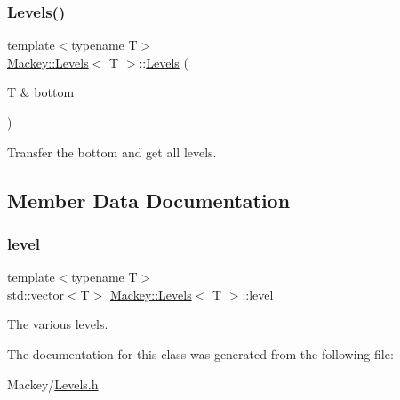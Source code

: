 \subsubsection{\texorpdfstring{Levels()}{Levels()}}
{\footnotesize\ttfamily template$<$typename T$>$ \\
\hyperlink{classMackey_1_1Levels}{Mackey\+::\+Levels}$<$ T $>$\+::\hyperlink{classMackey_1_1Levels}{Levels} (\begin{DoxyParamCaption}\item[{T \&}]{bottom }\end{DoxyParamCaption})\hspace{0.3cm}{\ttfamily [inline]}}



Transfer the bottom and get all levels. 



\subsection{Member Data Documentation}
\mbox{\label{classMackey_1_1Levels_af9a1391f683685ae464829b9b32162c8}} 
\subsubsection{\texorpdfstring{level}{level}}
{\footnotesize\ttfamily template$<$typename T$>$ \\
std\+::vector$<$T$>$ \hyperlink{classMackey_1_1Levels}{Mackey\+::\+Levels}$<$ T $>$\+::level}

The various levels. 

The documentation for this class was generated from the following file\+:\begin{DoxyCompactItemize}
\item 
Mackey/\hyperlink{Levels_8h}{Levels.\+h}\end{DoxyCompactItemize}
